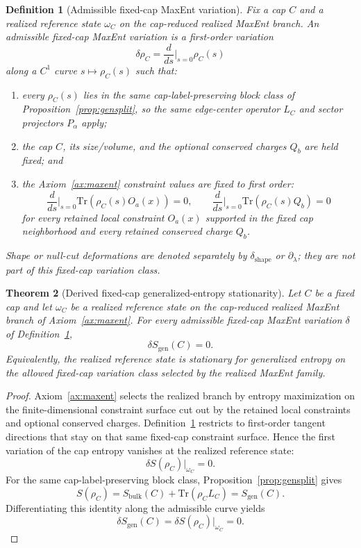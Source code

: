 \documentclass[11pt]{article}
\newtheorem{theorem}{Theorem}[section]
\newtheorem{definition}[theorem]{Definition}
\begin{document}
\begin{definition}[Admissible fixed-cap MaxEnt variation]\label{def:equilibriumvariation}
Fix a cap \(C\) and a realized reference state \(\omega_C\) on the cap-reduced realized MaxEnt branch. An admissible fixed-cap MaxEnt variation is a first-order variation
\[
\delta\rho_C=\frac{d}{ds}\Big|_{s=0}\rho_C(s)
\]
along a \(C^1\) curve \(s\mapsto \rho_C(s)\) such that:
\begin{enumerate}[leftmargin=2em]
\item every \(\rho_C(s)\) lies in the same cap-label-preserving block class of Proposition~\ref{prop:gensplit}, so the same edge-center operator \(L_C\) and sector projectors \(P_\alpha\) apply;
\item the cap \(C\), its size/volume, and the optional conserved charges \(Q_b\) are held fixed; and
\item the Axiom~\ref{ax:maxent} constraint values are fixed to first order:
\[
\frac{d}{ds}\Big|_{s=0}\mathrm{Tr}(\rho_C(s) O_a(x))=0,
\qquad
\frac{d}{ds}\Big|_{s=0}\mathrm{Tr}(\rho_C(s) Q_b)=0
\]
for every retained local constraint \(O_a(x)\) supported in the fixed cap neighborhood and every retained conserved charge \(Q_b\).
\end{enumerate}
Shape or null-cut deformations are denoted separately by \(\delta_{\mathrm{shape}}\) or \(\partial_\lambda\); they are not part of this fixed-cap variation class.
\end{definition}

\begin{theorem}[Derived fixed-cap generalized-entropy stationarity]\label{thm:equilibrium}
Let \(C\) be a fixed cap and let \(\omega_C\) be a realized reference state on the cap-reduced realized MaxEnt branch of Axiom~\ref{ax:maxent}. For every admissible fixed-cap MaxEnt variation \(\delta\) of Definition~\ref{def:equilibriumvariation},
\[
\delta S_{\mathrm{gen}}(C)=0.
\]
Equivalently, the realized reference state is stationary for generalized entropy on the allowed fixed-cap variation class selected by the realized MaxEnt family.
\end{theorem}

\begin{proof}
Axiom~\ref{ax:maxent} selects the realized branch by entropy maximization on the finite-dimensional constraint surface cut out by the retained local constraints and optional conserved charges. Definition~\ref{def:equilibriumvariation} restricts to first-order tangent directions that stay on that same fixed-cap constraint surface. Hence the first variation of the cap entropy vanishes at the realized reference state:
\[
\delta S(\rho_C)\big|_{\omega_C}=0.
\]
For the same cap-label-preserving block class, Proposition~\ref{prop:gensplit} gives
\[
S(\rho_C)=S_{\mathrm{bulk}}(C)+\mathrm{Tr}(\rho_C L_C)=S_{\mathrm{gen}}(C).
\]
Differentiating this identity along the admissible curve yields
\[
\delta S_{\mathrm{gen}}(C)=\delta S(\rho_C)\big|_{\omega_C}=0.
\]
\end{proof}
\end{document}
